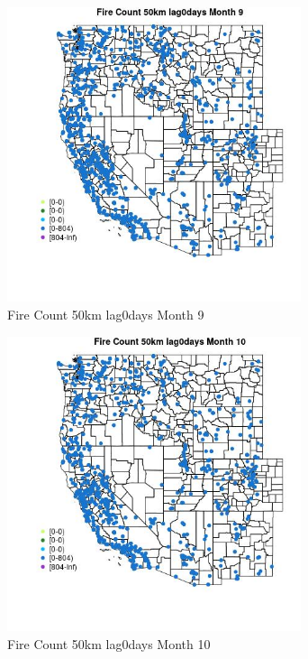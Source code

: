 \begin{figure} 
\centering  
\includegraphics[width=0.77\textwidth]{Code_Outputs/Report_ML_input_PM25_Step4_part_f_de_duplicated_aves_prioritize_24hr_obswNAs_MapObsMo9Fire_Count_50km_lag0days.jpg} 
\caption{\label{fig:Report_ML_input_PM25_Step4_part_f_de_duplicated_aves_prioritize_24hr_obswNAsMapObsMo9Fire_Count_50km_lag0days}Fire Count 50km lag0days Month 9} 
\end{figure} 
 

\begin{figure} 
\centering  
\includegraphics[width=0.77\textwidth]{Code_Outputs/Report_ML_input_PM25_Step4_part_f_de_duplicated_aves_prioritize_24hr_obswNAs_MapObsMo10Fire_Count_50km_lag0days.jpg} 
\caption{\label{fig:Report_ML_input_PM25_Step4_part_f_de_duplicated_aves_prioritize_24hr_obswNAsMapObsMo10Fire_Count_50km_lag0days}Fire Count 50km lag0days Month 10} 
\end{figure} 
 

